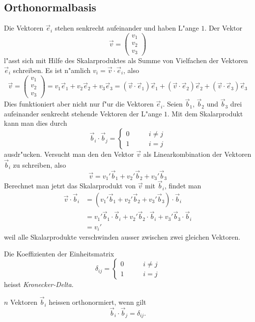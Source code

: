 \subsection{Orthonormalbasis}
Die Vektoren $\vec e_i$ stehen senkrecht aufeinander und haben
L"ange $1$.
Der Vektor
\[
\vec v
=
\begin{pmatrix}v_1\\v_2\\v_3\end{pmatrix}
\]
l"asst sich mit Hilfe des Skalarproduktes als Summe von Vielfachen
der Vektoren $\vec e_i$ schreiben.
Es ist n"amlich $v_i=\vec v\cdot\vec e_i$, also
\[
\vec v
=
\begin{pmatrix}v_1\\v_2\\v_3\end{pmatrix}
=
v_1\vec e_1
+
v_2\vec e_2
+
v_3\vec e_3
=
(\vec v\cdot \vec e_1)\vec e_1
+
(\vec v\cdot \vec e_2)\vec e_2
+
(\vec v\cdot \vec e_3)\vec e_3
\]
Dies funktioniert aber nicht nur f"ur die Vektoren $\vec e_i$.
Seien $\vec b_1$, $\vec b_2$ und $\vec b_3$ drei aufeinander senkrecht
stehende Vektoren der L"ange $1$.
Mit dem Skalarprodukt kann man dies durch
\[
\vec b_i\cdot\vec b_j=\begin{cases}
0&\qquad i\ne j\\
1&\qquad i=j
\end{cases}
\]
ausdr"ucken.
Versucht man den den Vektor $\vec v$ als Linearkombination
der Vektoren $\vec b_i$ zu schreiben, also
\[
\vec v
=
v_1'\vec b_1
+
v_2'\vec b_2
+
v_3'\vec b_3
\]
Berechnet man jetzt das Skalarprodukt von $\vec v$ mit $\vec b_i$,
findet man
\begin{align*}
\vec v\cdot \vec b_i
&=
(
v_1'\vec b_1
+
v_2'\vec b_2
+
v_3'\vec b_3
)\cdot
\vec b_i
\\
&=
v_1'\vec b_1\cdot\vec b_i
+
v_2'\vec b_2\cdot\vec b_i
+
v_3'\vec b_3\cdot\vec b_i
\\
&=v_i'
\end{align*}
weil alle Skalarprodukte verschwinden ausser zwischen
zwei gleichen Vektoren.

\begin{definition} Die Koeffizienten der Einheitsmatrix
\[
\delta_{ij}=
\begin{cases}
0&\qquad i\ne j\\
1&\qquad i=j
\end{cases}
\]
heisst {\em Kronecker-Delta}.
\end{definition}

\begin{definition}
$n$ Vektoren $\vec b_i$ heissen orthonormiert, wenn gilt
\[
\vec b_i\cdot\vec b_j=\delta_{ij}.
\]
\end{definition}

